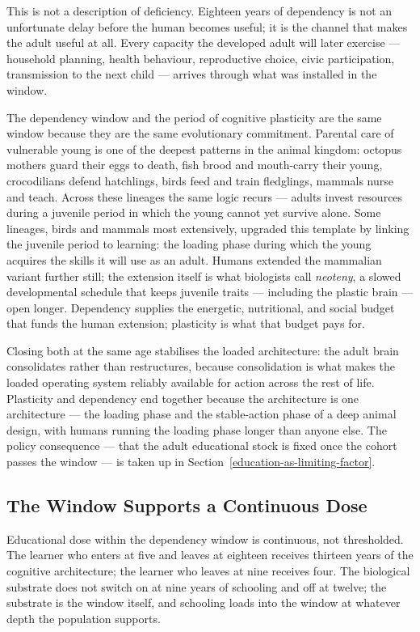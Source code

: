 \documentclass[12pt,letterpaper]{article}
\begin{document}
This is not a description of deficiency. Eighteen years of
dependency is not an unfortunate delay before the human becomes
useful; it is the channel that makes the adult useful at all. Every
capacity the developed adult will later exercise --- household
planning, health behaviour, reproductive choice, civic participation,
transmission to the next child --- arrives through what was installed
in the window.

The dependency window and the period of cognitive plasticity are
the same window because they are the same evolutionary commitment.
Parental care of vulnerable young is one of the deepest patterns
in the animal kingdom: octopus mothers guard their eggs to death,
fish brood and mouth-carry their young, crocodilians defend
hatchlings, birds feed and train fledglings, mammals nurse and
teach. Across these lineages the same logic recurs --- adults
invest resources during a juvenile period in which the young
cannot yet survive alone. Some lineages, birds and mammals most
extensively, upgraded this template by linking the juvenile period
to learning: the loading phase during which the young acquires
the skills it will use as an adult. Humans extended the mammalian
variant further still; the extension itself is what biologists
call \emph{neoteny}, a slowed developmental schedule that keeps
juvenile traits --- including the plastic brain --- open longer.
Dependency supplies the energetic, nutritional, and social budget
that funds the human extension; plasticity is what that budget
pays for.

Closing both at the same age stabilises the loaded
architecture: the adult brain consolidates rather than
restructures, because consolidation is what makes the loaded
operating system reliably available for action across the rest of
life. Plasticity and dependency end together because the
architecture is one architecture --- the loading phase and the
stable-action phase of a deep animal design, with humans running
the loading phase longer than anyone else. The policy consequence
--- that the adult educational stock is fixed once the cohort
passes the window --- is taken up in
Section~\ref{education-as-limiting-factor}.

\subsection{The Window Supports a Continuous Dose}\label{the-window-supports-a-continuous-dose}

Educational dose within the dependency window is continuous, not
thresholded. The learner who enters at five and leaves at eighteen
receives thirteen years of the cognitive architecture; the learner
who leaves at nine receives four. The biological substrate does not
switch on at nine years of schooling and off at twelve; the substrate
is the window itself, and schooling loads into the window at whatever
depth the population supports.
\end{document}
